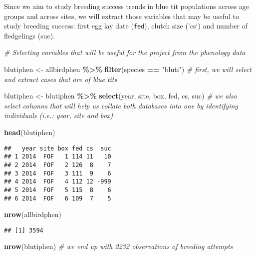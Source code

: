 \documentclass[
]{article}
\newenvironment{Shaded}{\begin{snugshade}}{\end{snugshade}}
\newcommand{\CommentTok}[1]{\textcolor[rgb]{0.56,0.35,0.01}{\textit{#1}}}
\newcommand{\FunctionTok}[1]{\textcolor[rgb]{0.13,0.29,0.53}{\textbf{#1}}}
\newcommand{\NormalTok}[1]{#1}
\newcommand{\OtherTok}[1]{\textcolor[rgb]{0.56,0.35,0.01}{#1}}
\newcommand{\SpecialCharTok}[1]{\textcolor[rgb]{0.81,0.36,0.00}{\textbf{#1}}}
\newcommand{\StringTok}[1]{\textcolor[rgb]{0.31,0.60,0.02}{#1}}
\begin{document}
Since we aim to study breeding success trends in blue tit populations
across age groups and across sites, we will extract those variables that
may be useful to study breeding success: first egg lay date
(\texttt{fed}), clutch size ('cs`) and number of fledgelings (suc).

\begin{Shaded}
\begin{Highlighting}[]
\CommentTok{\# Selecting variables that will be useful for the project from the phenology data}

\NormalTok{blutiphen }\OtherTok{\textless{}{-}}\NormalTok{ allbirdphen }\SpecialCharTok{\%\textgreater{}\%} \FunctionTok{filter}\NormalTok{(species }\SpecialCharTok{==} \StringTok{"bluti"}\NormalTok{)  }\CommentTok{\# first, we will select and extract cases that are of blue tits}

\NormalTok{blutiphen }\OtherTok{\textless{}{-}}\NormalTok{ blutiphen }\SpecialCharTok{\%\textgreater{}\%} \FunctionTok{select}\NormalTok{(year, site, box, fed, cs, suc)  }\CommentTok{\# we also select columns that will help us collate both databases into one by identifying individuals (i.e.: year, site and box)}

\FunctionTok{head}\NormalTok{(blutiphen)}
\end{Highlighting}
\end{Shaded}

\begin{verbatim}
##   year site box fed cs  suc
## 1 2014  FOF   1 114 11   10
## 2 2014  FOF   2 126  8    7
## 3 2014  FOF   3 111  9    6
## 4 2014  FOF   4 112 12 -999
## 5 2014  FOF   5 115  8    6
## 6 2014  FOF   6 109  7    5
\end{verbatim}

\begin{Shaded}
\begin{Highlighting}[]
\FunctionTok{nrow}\NormalTok{(allbirdphen)}
\end{Highlighting}
\end{Shaded}

\begin{verbatim}
## [1] 3594
\end{verbatim}

\begin{Shaded}
\begin{Highlighting}[]
\FunctionTok{nrow}\NormalTok{(blutiphen)  }\CommentTok{\# we end up with 2232 observations of breeding attempts}
\end{Highlighting}
\end{Shaded}
\end{document}
